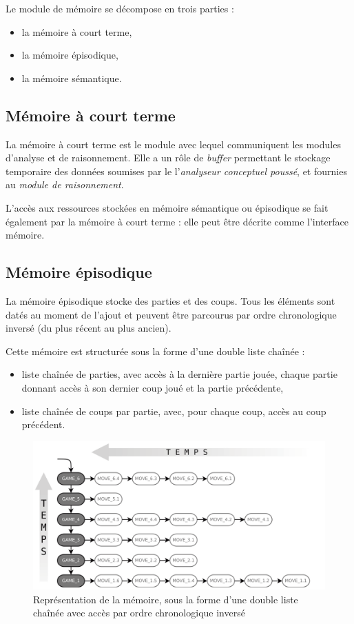 Le module de mémoire se décompose en trois parties :
\begin{itemize}
\item la mémoire à court terme,
\item la mémoire épisodique,
\item la mémoire sémantique.
\end{itemize}

\subsection{Mémoire à court terme}

La mémoire à court terme est le module avec lequel communiquent les modules d'analyse et de raisonnement. Elle a un rôle de \emph{buffer} permettant le stockage temporaire des données soumises par le l'\emph{analyseur conceptuel poussé}, et fournies au \emph{module de raisonnement}.

L'accès aux ressources stockées en mémoire sémantique ou épisodique se fait également par la mémoire à court terme : elle peut être décrite comme l'interface mémoire.

\subsection{Mémoire épisodique}
\label{conception_memoire_episodique}

La mémoire épisodique stocke des parties et des coups. Tous les éléments sont datés au moment de l'ajout et peuvent être parcourus par ordre chronologique inversé (du plus récent au plus ancien).

Cette mémoire est structurée sous la forme d'une double liste chaînée :
\begin{itemize}
\item liste chaînée de parties, avec accès à la dernière partie jouée, chaque partie donnant accès à son dernier coup joué et la partie précédente,
\item liste chaînée de coups par partie, avec, pour chaque coup, accès au coup précédent.
\end{itemize}

\begin{figure}[H]
\includegraphics[width=\textwidth]{files/memoire/episodic_general}
\caption{Représentation de la mémoire, sous la forme d'une double liste chaînée avec accès par ordre chronologique inversé}
\end{figure}

